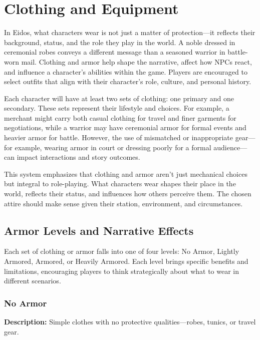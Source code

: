 \documentclass[12pt]{book}
\begin{document}
\chapter{Clothing and Equipment}

In Eidos, what characters wear is not just a matter of protection—it reflects their background, status, and the role they play in the world. A noble dressed in ceremonial robes conveys a different message than a seasoned warrior in battle-worn mail. Clothing and armor help shape the narrative, affect how NPCs react, and influence a character’s abilities within the game. Players are encouraged to select outfits that align with their character’s role, culture, and personal history.

Each character will have at least two sets of clothing: one primary and one secondary. These sets represent their lifestyle and choices. For example, a merchant might carry both casual clothing for travel and finer garments for negotiations, while a warrior may have ceremonial armor for formal events and heavier armor for battle. However, the use of mismatched or inappropriate gear—for example, wearing armor in court or dressing poorly for a formal audience—can impact interactions and story outcomes.

This system emphasizes that clothing and armor aren’t just mechanical choices but integral to role-playing. What characters wear shapes their place in the world, reflects their status, and influences how others perceive them. The chosen attire should make sense given their station, environment, and circumstances.

\section{Armor Levels and Narrative Effects}

Each set of clothing or armor falls into one of four levels: No Armor, Lightly Armored, Armored, or Heavily Armored. Each level brings specific benefits and limitations, encouraging players to think strategically about what to wear in different scenarios.

\subsection*{No Armor}

\textbf{Description:} Simple clothes with no protective qualities—robes, tunics, or travel gear.
\end{document}
